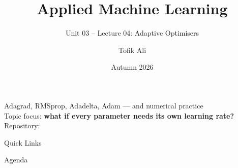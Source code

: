 \documentclass[aspectratio=169]{beamer}
\title[Applied Machine Learning]{Applied Machine Learning}
\subtitle{Unit 03 -- Lecture 04: Adaptive Optimisers}
\author{Tofik Ali}
\institute{School of Computer Science, UPES Dehradun}
\date{Autumn 2026}
\begin{document}
\UPESCoverFrame
\setcounter{framenumber}{0}

\begin{frame}
  \titlepage
  \vspace{0.3em}
  \begin{center}
    \footnotesize Adagrad, RMSprop, Adadelta, Adam --- and numerical practice\\[0.25em]
    \footnotesize Topic focus: \textbf{what if every parameter needs its own
      learning rate?}\\[0.25em]
    \footnotesize Repository: \texttt{\AMLRepoURL}
  \end{center}
  \slidesources{\AMLUnitIIISources}
\end{frame}

\begin{frame}{Quick Links}
  \centering
  \hyperlink{sec:why}{}\hspace{0.4em}
  \hyperlink{sec:adagrad}{}\hspace{0.4em}
  \hyperlink{sec:rmsprop}{}\hspace{0.4em}
  \hyperlink{sec:adadelta}{}\hspace{0.4em}
  \hyperlink{sec:adam}{}\hspace{0.4em}
  \hyperlink{sec:practice}{}\hspace{0.4em}
  \hyperlink{sec:summary}{}
\end{frame}

\begin{frame}{Agenda}
  \tableofcontents
\end{frame}
\end{document}
